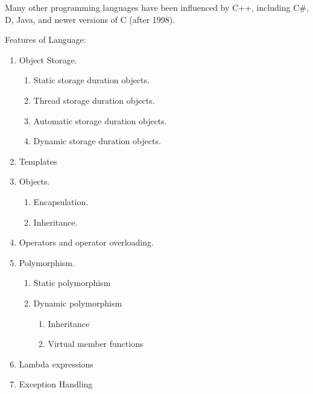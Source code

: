 Many other programming languages have been influenced by C++, including C\#, D, Java, and newer versions of C (after 1998).

Features of Language:
\begin{enumerate}
	\item Object Storage.
	\begin{enumerate}
		\item Static storage duration objects.
		\item Thread storage duration objects.
		\item Automatic storage duration objects.
		\item Dynamic storage duration objects.
	\end{enumerate}
	\item Templates
	\item Objects.
	\begin{enumerate}
		\item Encapsulation.
		\item Inheritance.
	\end{enumerate}
	\item Operators and operator overloading.
	\item Polymorphism.
	\begin{enumerate}
		\item Static polymorphism
		\item Dynamic polymorphism
		\begin{enumerate}
			\item Inheritance
			\item Virtual member functions
		\end{enumerate}
	\end{enumerate}
\item Lambda expressions
\item Exception Handling
\end{enumerate}
